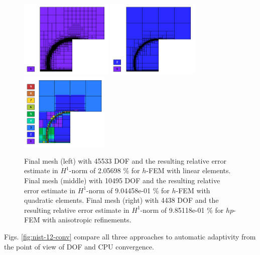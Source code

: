 \documentclass[12pt]{elsarticle}
\begin{document}
\begin{figure}[!ht]
\centering
\includegraphics[height=3.7cm]{nist/nist-12/mesh_h1_aniso.png}
\includegraphics[height=3.7cm]{nist/nist-12/mesh_h2_aniso.png}
\includegraphics[height=3.7cm]{nist/nist-12/mesh_hp_aniso.png}
\caption{
Final mesh (left) with 45533 DOF and the resulting
relative error estimate in $H^1$-norm of 2.05698 \% for $h$-FEM with linear elements.
Final mesh (middle) with 10495 DOF and the resulting
relative error estimate in $H^1$-norm of 9.04458e-01 \% for $h$-FEM with quadratic elements.
Final mesh (right) with 4438 DOF and the resulting
relative error estimate in $H^1$-norm of 9.85118e-01 \% for $hp$-FEM with anisotropic refinements.}
\label{fig:nist-12-hp-aniso}
\end{figure}


Figs. \ref{fig:nist-12-conv} compare all
three approaches to automatic adaptivity from the point
of view of DOF and CPU convergence.
\end{document}
